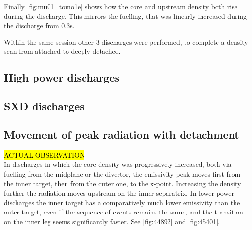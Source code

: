 Finally \autoref{fig:mu01_tomo1e} shows how the core and upstream density both rise during the discharge. This mirrors the fuelling, that was linearly increased during the discharge from 0.3s.


Within the same session other 3 discharges were performed, to complete a density scan from attached to deeply detached. 

\subsection{High power discharges}


\subsection{SXD discharges}


\subsection{Movement of peak radiation with detachment}
\hl{ACTUAL OBSERVATION}\\
In discharges in which the core density was progressively increased, both via fuelling from the midplane or the divertor, the emissivity peak moves first from the inner target, then from the outer one, to the x-point. Increasing the density further the radiation moves upstream on the inner separatrix.
In lower power discharges the inner target has a comparatively much lower emissivity than the outer target, even if the sequence of events remains the same, and the transition on the inner leg seems significantly faster.
See \autoref{fig:44892} and \autoref{fig:45401}.

